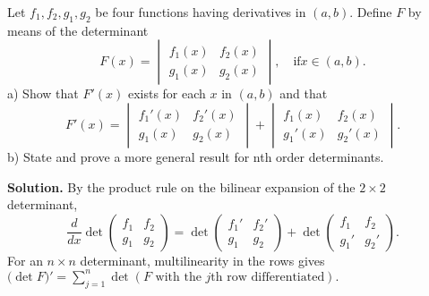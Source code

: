 \begin{problembox}
Let \( f_1, f_2, g_1, g_2 \) be four functions having derivatives in \( (a, b) \). Define \( F \) by means of the determinant
\[ F(x) = \begin{vmatrix}
f_1(x) & f_2(x) \\
g_1(x) & g_2(x)
\end{vmatrix}, \quad \text{if} x \in (a, b). \]
a) Show that \( F'(x) \) exists for each \( x \) in \( (a, b) \) and that
\[ F'(x) = \begin{vmatrix}
f_1'(x) & f_2'(x) \\
g_1(x) & g_2(x)
\end{vmatrix} + \begin{vmatrix}
f_1(x) & f_2(x) \\
g_1'(x) & g_2'(x)
\end{vmatrix}. \]
b) State and prove a more general result for nth order determinants.
\end{problembox}

\noindent\textbf{Solution.}
By the product rule on the bilinear expansion of the $2\times2$ determinant,
\[\frac{d}{dx}\det\begin{pmatrix}f_1&f_2\\ g_1&g_2\end{pmatrix}=\det\begin{pmatrix}f_1'&f_2'\\ g_1&g_2\end{pmatrix}+\det\begin{pmatrix}f_1&f_2\\ g_1'&g_2'\end{pmatrix}.\]
For an $n\times n$ determinant, multilinearity in the rows gives $\big(\det F\big)'=\sum_{j=1}^{n}\det(F\text{ with the $j$th row differentiated}).$

